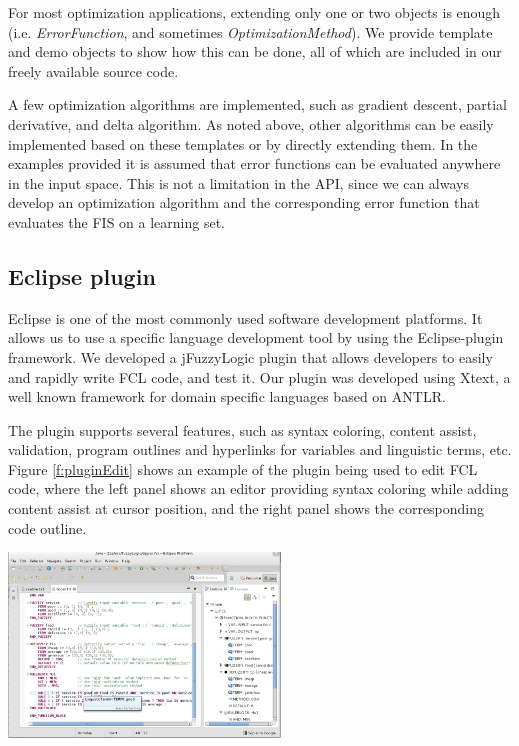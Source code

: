 \documentclass[11pt,twoside]{article}
\begin{document}
\begin{multicols}{2}
For most optimization applications, extending only one or two objects is enough (i.e. \textit{ErrorFunction}, and sometimes \textit{OptimizationMethod}). We provide template and demo objects to show how this can be done, all of which are included in our freely available source code.

A few optimization algorithms are implemented, such as gradient descent, partial derivative, and delta algorithm. As noted above, other algorithms can be easily implemented based on these templates or by directly extending them. In the examples provided it is assumed that error functions can be evaluated anywhere in the input space. This is not a limitation in the API, since we can always develop an optimization algorithm and the corresponding error function that evaluates the FIS on a learning set.

\subsection{Eclipse plugin\label{sec:pluggin}}

Eclipse is one of the most commonly used software development platforms. It allows us to use a specific language development tool by using the Eclipse-plugin framework. We developed a jFuzzyLogic plugin that allows developers to easily and rapidly write FCL code, and test it. Our plugin was developed using Xtext, a well known framework for domain specific languages based on ANTLR.

The plugin supports several features, such as syntax coloring, content assist, validation, program outlines and hyperlinks for variables and linguistic terms, etc. Figure \ref{f:pluginEdit} shows an example of the plugin being used to edit FCL code, where the left panel shows an editor providing syntax coloring while adding content assist at cursor position, and the right panel shows the corresponding code outline. 

\vspace*{5pt}
\centerline{\includegraphics[width=2.84in]{./figs/plugin_edit}}
\label{f:pluginEdit}


\end{multicols}
\end{document}
